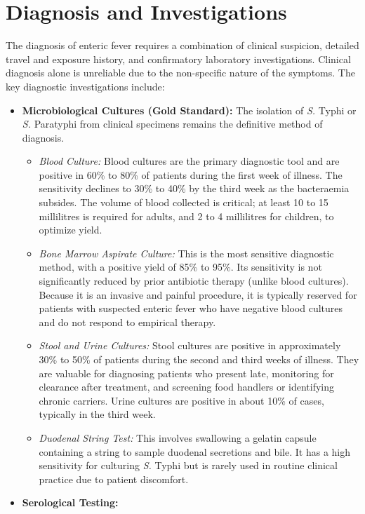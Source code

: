 \section*{Diagnosis and Investigations}
The diagnosis of enteric fever requires a combination of clinical suspicion, detailed travel and exposure history, and confirmatory laboratory investigations. Clinical diagnosis alone is unreliable due to the non-specific nature of the symptoms.
The key diagnostic investigations include:
\begin{itemize}
\item \textbf{Microbiological Cultures (Gold Standard):} The isolation of \textit{S.} Typhi or \textit{S.} Paratyphi from clinical specimens remains the definitive method of diagnosis.
  \begin{itemize}
  \item \textit{Blood Culture:} Blood cultures are the primary diagnostic tool and are positive in 60\% to 80\% of patients during the first week of illness. The sensitivity declines to 30\% to 40\% by the third week as the bacteraemia subsides. The volume of blood collected is critical; at least 10 to 15 millilitres is required for adults, and 2 to 4 millilitres for children, to optimize yield.
  \item \textit{Bone Marrow Aspirate Culture:} This is the most sensitive diagnostic method, with a positive yield of 85\% to 95\%. Its sensitivity is not significantly reduced by prior antibiotic therapy (unlike blood cultures). Because it is an invasive and painful procedure, it is typically reserved for patients with suspected enteric fever who have negative blood cultures and do not respond to empirical therapy.
  \item \textit{Stool and Urine Cultures:} Stool cultures are positive in approximately 30\% to 50\% of patients during the second and third weeks of illness. They are valuable for diagnosing patients who present late, monitoring for clearance after treatment, and screening food handlers or identifying chronic carriers. Urine cultures are positive in about 10\% of cases, typically in the third week.
  \item \textit{Duodenal String Test:} This involves swallowing a gelatin capsule containing a string to sample duodenal secretions and bile. It has a high sensitivity for culturing \textit{S.} Typhi but is rarely used in routine clinical practice due to patient discomfort.
  \end{itemize}
\item \textbf{Serological Testing:}

\end{itemize}

